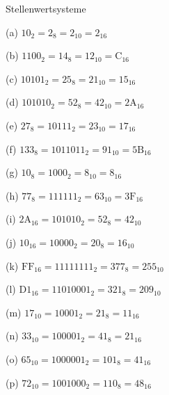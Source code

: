 \begin{frame}[t]
\begin{exercise}{Stellenwertsysteme}
\begin{solution}
\begin{center}
\begin{minipage}{0.45\textwidth}
\begin{parts}
\item[(a)] $10_2 = 2_8 = 2_{10} = 2_{16}$
\item[(b)] $1100_2 = 14_8 = 12_{10} = \mathrm{C}_{16}$
\item[(c)] $10101_2 = 25_8 = 21_{10} = 15_{16}$
\item[(d)] $101010_2 = 52_8 = 42_{10} = \mathrm{2A}_{16}$
\item[(e)] $27_8 = 10111_2 = 23_{10} = 17_{16}$
\item[(f)] $133_8 = 1011011_2 = 91_{10} = \mathrm{5B}_{16}$
\item[(g)] $10_8 = 1000_2 = 8_{10} = 8_{16}$
\item[(h)] $77_8 = 111111_2 = 63_{10} = \mathrm{3F}_{16}$
\end{parts}
\end{minipage}
\begin{minipage}{0.45\textwidth}
\begin{parts}
\item[(i)] $\mathrm{2A}_{16} = 101010_2 = 52_8 = 42_{10}$
\item[(j)] $10_{16} = 10000_2 = 20_8 = 16_{10}$
\item[(k)] $\mathrm{FF}_{16} = 11111111_2 = 377_8 = 255_{10}$
\item[(l)] $\mathrm{D1}_{16} = 11010001_2 = 321_8 = 209_{10}$
\item[(m)] $17_{10} = 10001_2 = 21_8 = 11_{16}$
\item[(n)] $33_{10} = 100001_2 = 41_8 = 21_{16}$
\item[(o)] $65_{10} = 1000001_2 = 101_8 = 41_{16}$
\item[(p)] $72_{10} = 1001000_2 = 110_8 = 48_{16}$
\end{parts}
\end{minipage}
\end{center}
\end{solution}
\end{exercise}
\end{frame}
